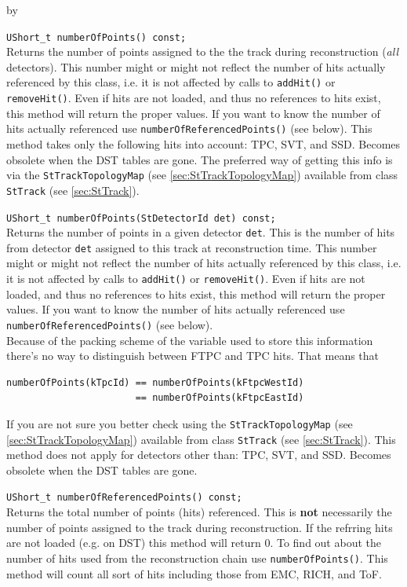 \documentclass[twoside]{article}
\newcommand{\entrylabel}[1]{\mbox{\textbf{{#1}}}\hfil}%
\newenvironment{entry}
{\begin{list}{}%
    {\renewcommand{\makelabel}{\entrylabel}%
     \setlength{\labelwidth}{90pt}%
     \setlength{\leftmargin}{\labelwidth}
     \advance\leftmargin by \labelsep%
      }%
    }%
  {\end{list}}
\newcommand{\Entrylabel}[1]%
{\raisebox{0pt}[1ex][0pt]{\makebox[\labelwidth][l]%
    {\parbox[t]{\labelwidth}{\hspace{0pt}\textbf{{#1}}}}}}
\newenvironment{Entry}%
{\renewcommand{\entrylabel}{\Entrylabel}\begin{entry}}%
  {\end{entry}}
\begin{document}
\begin{Entry}
    \verb+UShort_t numberOfPoints() const;+\\
    Returns the number of points assigned to the the track during
    reconstruction (\emph{all} detectors).  This number might or might
    not reflect the number of hits actually referenced by this class,
    i.e. it is not affected by calls to \texttt{addHit()} or
    \texttt{removeHit()}. Even if hits are not loaded, and thus no
    references to hits exist, this method will return the proper
    values. If you want to know the number of hits actually referenced
    use \texttt{numberOfReferencedPoints()} (see below).
    This method takes only the following hits into account: TPC, SVT, and SSD.
    Becomes obsolete when the DST tables are gone.
    The preferred way of getting this info is via the \texttt{StTrackTopologyMap}
    (see \ref{sec:StTrackTopologyMap}) available from class \texttt{StTrack} (see
    \ref{sec:StTrack}). 


    \verb+UShort_t numberOfPoints(StDetectorId det) const;+\\
    Returns the number of points in a given detector \texttt{det}.
    This is the number of hits from detector \texttt{det} assigned to
    this track at reconstruction time. This number might or might not
    reflect the number of hits actually referenced by this class, i.e.
    it is not affected by calls to \texttt{addHit()} or
    \texttt{removeHit()}.  Even if hits are not loaded, and thus no
    references to hits exist, this method will return the proper
    values. If you want to know the number of hits actually referenced
    use \texttt{numberOfReferencedPoints()} (see below).\\
    Because of the packing scheme of the variable used to store
    this information there's no way to distinguish between FTPC and TPC
    hits. That means that
    \begin{verbatim}
numberOfPoints(kTpcId) == numberOfPoints(kFtpcWestId)
                       == numberOfPoints(kFtpcEastId)
    \end{verbatim}
    If you are not sure you better check using the \texttt{StTrackTopologyMap}
    (see \ref{sec:StTrackTopologyMap}) available from class \texttt{StTrack} (see
    \ref{sec:StTrack}). 
    This method does not apply for detectors other than: TPC, SVT, and SSD.
    Becomes obsolete when the DST tables are gone.

    
    \verb+UShort_t numberOfReferencedPoints() const;+\\
    Returns the total number of points (hits) referenced. This is
    \textbf{not} necessarily the number of points assigned to the
    track during reconstruction. If the refrring hits are not loaded
    (e.g. on DST) this method will return 0. To find out about the number of hits
    used from the reconstruction chain use \texttt{numberOfPoints()}.
    This method will count all sort of hits including those from EMC, RICH, and ToF.


\end{Entry}
\end{document}
